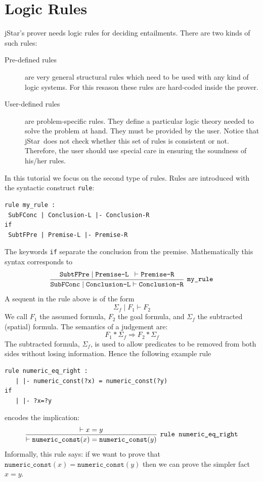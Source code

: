 \documentclass[11pt]{article}
\newcommand{\jStar}{{\sf jStar}}
\begin{document}
\section{Logic Rules}
\label{sec:logic-rules}
\jStar's  prover needs logic rules for deciding entailments. There are
two kinds of such rules:\begin{description}
\item[Pre-defined rules] are very general structural rules which need
  to be used with any kind of logic systems. For this resason these
  rules are hard-coded inside the prover.
\item[User-defined rules] are problem-specific rules. They define a
  particular logic theory needed to solve the problem at hand. They
  must be provided by the user. Notice that \jStar \ does not check whether this set of rules is 
  consistent or not. Therefore, the user should use special care in ensuring the soundness of his/her rules.
\end{description} 
In this tutorial we focus on the second type of rules. Rules are introduced with
the syntactic construct {\tt rule}:
\begin{verbatim}
rule my_rule :
 SubFConc | Conclusion-L |- Conclusion-R 
if 
 SubtFPre | Premise-L |- Premise-R
  \end{verbatim}
The keywords {\tt if} separate the conclusion from the premise.
Mathematically this syntax corresponds to
\[
\infer[\texttt{my\_rule}]
{ \texttt{SubFConc} \mid \texttt{Conclusion-L}  \vdash   \texttt{Conclusion-R} }
{ \texttt{SubtFPre} \mid \texttt{Premise-L } \vdash   \texttt{Premise-R}} 
\]
A sequent in the rule above is of the form
\[
\Sigma_f \mid F_1 \vdash F_2
\]
We call $F_1$ the assumed formula, $F_2$ the goal formula, and $\Sigma_f$ the subtracted (spatial)
formula. The semantics of a judgement are:
\[
F_1 *\Sigma_f  \Longrightarrow F_2 * \Sigma_f 
\]
The subtracted formula, $\Sigma_f$, is used to allow predicates to be
removed from both sides without losing information. Hence the 
following example rule 
\begin{verbatim}
rule numeric_eq_right :
   | |- numeric_const(?x) = numeric_const(?y) 
if
   | |- ?x=?y
\end{verbatim}
encodes the implication:
\[
\infer[\texttt{rule numeric\_eq\_right}]{ \vdash \texttt{numeric\_const}(x) = \texttt{numeric\_const}(y)}{ \vdash x=y}
\]
Informally, this rule says: if we want to prove that $\texttt{numeric\_const}(x) = \texttt{numeric\_const}(y)$ then we can prove the simpler fact $x=y$.
\end{document}
